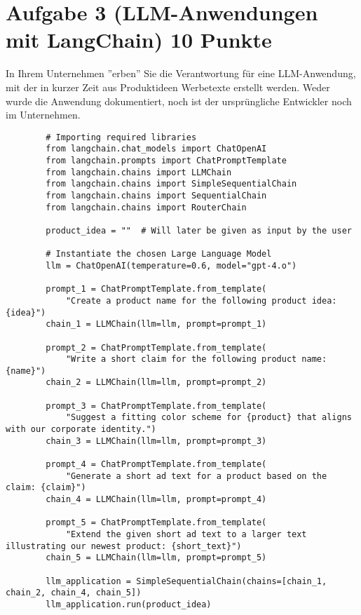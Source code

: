 \documentclass[12pt, ngerman]{AssignmentClass}
\begin{document}
\section*{Aufgabe 3 (LLM-Anwendungen mit LangChain) \hfill 10 Punkte}
    In Ihrem Unternehmen ''erben'' Sie die Verantwortung für eine LLM-Anwendung, mit der in kurzer Zeit aus Produktideen Werbetexte erstellt werden. Weder wurde die Anwendung dokumentiert, noch ist der ursprüngliche Entwickler noch im Unternehmen.
    

    \vspace{0.5cm}
    \begin{lstlisting}
        # Importing required libraries
        from langchain.chat_models import ChatOpenAI
        from langchain.prompts import ChatPromptTemplate
        from langchain.chains import LLMChain
        from langchain.chains import SimpleSequentialChain
        from langchain.chains import SequentialChain
        from langchain.chains import RouterChain
        
        product_idea = ""  # Will later be given as input by the user
        
        # Instantiate the chosen Large Language Model
        llm = ChatOpenAI(temperature=0.6, model="gpt-4.o")
        
        prompt_1 = ChatPromptTemplate.from_template(
            "Create a product name for the following product idea: {idea}")
        chain_1 = LLMChain(llm=llm, prompt=prompt_1)
        
        prompt_2 = ChatPromptTemplate.from_template(
            "Write a short claim for the following product name: {name}")
        chain_2 = LLMChain(llm=llm, prompt=prompt_2)
        
        prompt_3 = ChatPromptTemplate.from_template(
            "Suggest a fitting color scheme for {product} that aligns with our corporate identity.")
        chain_3 = LLMChain(llm=llm, prompt=prompt_3)
        
        prompt_4 = ChatPromptTemplate.from_template(
            "Generate a short ad text for a product based on the claim: {claim}")
        chain_4 = LLMChain(llm=llm, prompt=prompt_4)
        
        prompt_5 = ChatPromptTemplate.from_template(
            "Extend the given short ad text to a larger text illustrating our newest product: {short_text}")
        chain_5 = LLMChain(llm=llm, prompt=prompt_5)
        
        llm_application = SimpleSequentialChain(chains=[chain_1, chain_2, chain_4, chain_5])
        llm_application.run(product_idea)
    \end{lstlisting}
\end{document}
